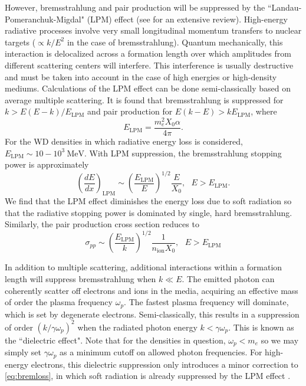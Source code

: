 \documentclass[twocolumn,showpacs,preprintnumbers,amsmath,amssymb,prd]{revtex4}
\def\r{\right)}
\def\l{\left(}
\begin{document}
\begin{appendices}
However, bremsstrahlung and pair production will be suppressed by the ``Landau-Pomeranchuk-Migdal" (LPM) effect (see \cite{Klein:1998du} for an extensive review).
High-energy radiative processes involve very small longitudinal momentum transfers to nuclear targets ($\propto k/E^2$ in the case of bremsstrahlung).
Quantum mechanically, this interaction is delocalized across a formation length over which amplitudes from different scattering centers will interfere.
This interference is usually destructive and must be taken into account in the case of high energies or high-density mediums.
Calculations of the LPM effect can be done semi-classically based on average multiple scattering.
It is found that bremsstrahlung is suppressed for $k > E(E-k)/E_\text{LPM}$ and pair production for $E(k-E) > k E_\text{LPM}$, where
\begin{equation}
\label{eq:LPM}
E_\text{LPM} = \frac{m_e^2 X_0 \alpha}{4 \pi}.
\end{equation}
For the WD densities in which radiative energy loss is considered, $E_\text{LPM} \sim 10-10^{3} ~\text{MeV}$.
With LPM suppression, the bremsstrahlung stopping power is approximately
\begin{equation}
\label{eq:bremloss}
\l\frac{dE}{dx}\r_\text{LPM} \sim \l\frac{E_\text{LPM}}{E} \r^{1/2} \frac{E}{X_0}, ~~~ E>E_\text{LPM}.
\end{equation}
We find that the LPM effect diminishes the energy loss due to soft radiation so that the radiative stopping power is dominated by single, hard bremsstrahlung.
Similarly, the pair production cross section reduces to
\begin{equation}
\sigma_{pp} \sim \l\frac{E_\text{LPM}}{k} \r^{1/2} \frac{1}{n_\text{ion} X_0}, ~~~ E>E_\text{LPM}
\end{equation}

In addition to multiple scattering, additional interactions within a formation length will suppress bremsstrahlung when $k \ll E$.
The emitted photon can coherently scatter off electrons and ions in the media, acquiring an effective mass of order the plasma frequency $\omega_p$.
The fastest plasma frequency will dominate, which is set by degenerate electrons.
Semi-classically, this results in a suppression of order $(k/\gamma \omega_p)^2$ when the radiated photon energy $k < \gamma \omega_p $.
This is known as the ``dielectric effect".
Note that for the densities in question, $\omega_p < m_e$ so we may simply set $\gamma \omega_p$ as a minimum cutoff on allowed photon frequencies.
For high-energy electrons, this dielectric suppression only introduces a minor correction to \eqref{eq:bremloss}, in which soft radiation is already suppressed by the LPM effect \cite{Klein:1998du}.


\end{appendices}
\end{document}
